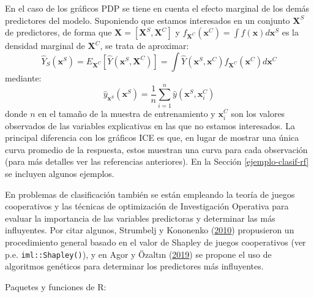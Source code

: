 \documentclass[
]{book}
\theoremstyle{break}
\theoremstyle{nonumberplain}
\begin{document}
En el caso de los gráficos PDP se tiene en cuenta el efecto marginal de los demás predictores del modelo.
Suponiendo que estamos interesados en un conjunto \(\mathbf X^S\) de predictores, de forma que \(\mathbf X = [\mathbf X^S, \mathbf X^C]\) y \(f_{\mathbf X^C}(\mathbf x^C) = \int f(\mathbf x) d\mathbf x^S\) es la densidad marginal de \(\mathbf X^C\), se trata de aproximar:
\[\hat Y_S(\mathbf x^S) = E_{\mathbf X^C}\left[\hat{Y}(\mathbf x^S,\mathbf X^C)\right]=\int\hat{Y}(\mathbf x^S,\mathbf x^C)f_{\mathbf X^C}(\mathbf x^C)d\mathbf x^C\] mediante: \[\hat{y}_{\mathbf x^S}(\mathbf x^S)=\frac{1}{n}\sum_{i=1}^n\hat{y}(\mathbf x^S, \mathbf x^C_i)\]
donde \(n\) en el tamaño de la muestra de entrenamiento y \(\mathbf x^C_i\) son los valores observados de las variables explicativas en las que no estamos interesados.
La principal diferencia con los gráficos ICE es que, en lugar de mostrar una única curva promedio de la respuesta, estos muestran una curva para cada observación (para más detalles ver las referencias anteriores).
En la Sección \ref{ejemplo-clasif-rf} se incluyen algunos ejemplos.

En problemas de clasificación también se están empleando la teoría de juegos cooperativos y las técnicas de optimización de Investigación Operativa para evaluar la importancia de las variables predictoras y determinar las más influyentes.
Por citar algunos, Strumbelj y Kononenko (\protect\hyperlink{ref-strumbelj2010efficient}{2010}) propusieron un procedimiento general basado en el valor de Shapley de juegos cooperativos (ver p.e. \texttt{iml::Shapley()}), y en Agor y Özaltın (\protect\hyperlink{ref-agor2019feature}{2019}) se propone el uso de algoritmos genéticos para determinar los predictores más influyentes.

Paquetes y funciones de R:
\end{document}
